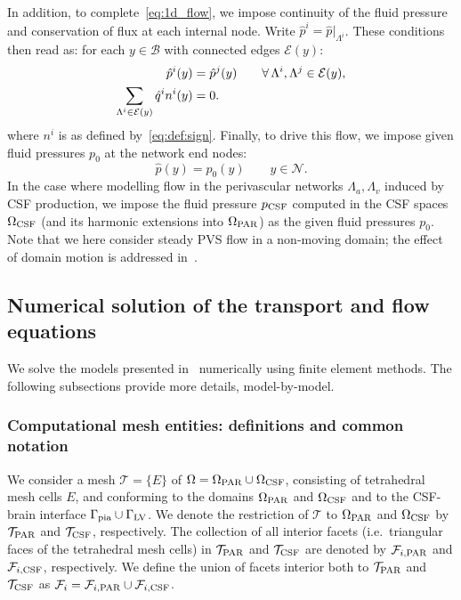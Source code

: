 In addition, to complete~\eqref{eq:1d_flow}, we impose continuity of
the fluid pressure and conservation of flux at each internal node. Write
$\hat{p}^i = \hat{p}|_{\Lambda^i}$. These conditions then read as: for
each $y \in \mathcal{B}$ with connected edges $\mathcal{E}(y)$:
\begin{subequations}
\begin{align}
  \hat{p}^i(y) &= \hat{p}^j(y) \qquad \forall \, \Lambda^i, \Lambda^j \in \mathcal{E}(y), \\
  \sum_{\Lambda^i \in \mathcal{E}(y)} \hat{q}^i n^i(y) &= 0  .
\end{align}
\label{eq:1d_flow:bifurcations}
\end{subequations}
where $n^i$ is as defined by~\eqref{eq:def:sign}. Finally, to drive this flow, we impose given fluid pressures $p_0$ at the
network end nodes:
\begin{equation}
  \hat{p}(y) = p_0(y) \qquad y \in \mathcal{N} .
  \label{eq:1d_flow:bcs}
\end{equation}
In the case where modelling flow in the perivascular networks
$\Lambda_a, \Lambda_v$ induced by CSF production, we impose the fluid
pressure $p_{\rm CSF}$ computed in the CSF spaces $\Omega_{\rm CSF}$
(and its harmonic extensions into $\Omega_{\rm PAR}$) as the given
fluid pressures $p_0$. Note that we here consider steady PVS flow in a
non-moving domain; the effect of domain motion is addressed
in~.

\subsection{Numerical solution of the transport and flow equations}
\label{sec:app:details_numerical_method}

We solve the models presented in~ numerically
using finite element methods. The following subsections provide more
details, model-by-model. 

\subsubsection{Computational mesh entities: definitions and common notation}

We consider a mesh $\mathcal{T} = \{ E \}$ of $\Omega = \Omega_{\rm
  PAR} \cup \Omega_{\rm CSF}$, consisting of tetrahedral mesh cells
$E$, and conforming to the domains $\Omega_{\rm PAR}$ and $\Omega_{\rm
  CSF}$ and to the CSF-brain interface $\Gamma_{\rm pia} \cup
\Gamma_{\rm LV}$. We denote the restriction of $\mathcal{T}$ to
$\Omega_{\rm PAR}$ and $\Omega_{\rm CSF}$ by $\mathcal{T}_{\rm PAR}$
and $\mathcal{T}_{\rm CSF}$, respectively. The collection of all
interior facets (i.e.~triangular faces of the tetrahedral mesh cells)
in $\mathcal{T}_{\rm PAR}$ and $\mathcal{T}_{\rm CSF}$ are denoted by
$\mathcal{F}_{i, \rm PAR}$ and $\mathcal{F}_{i, \rm CSF}$,
respectively. We define the union of facets interior both to
$\mathcal{T}_{ \rm PAR}$ and $\mathcal{T}_{ \rm CSF}$ as
$\mathcal{F}_i = \mathcal{F}_{i, \rm PAR} \cup \mathcal{F}_{i, \rm
  CSF}$. 

